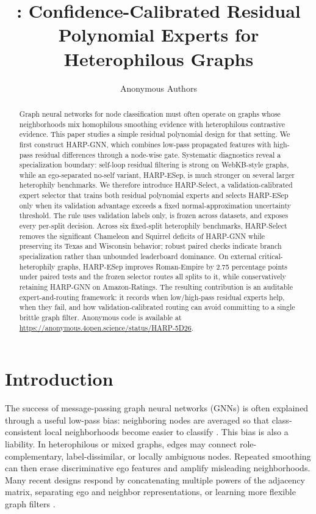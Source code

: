 \documentclass[letterpaper]{article} %
\title{\method: Confidence-Calibrated Residual Polynomial Experts for Heterophilous Graphs}
\author{
    Anonymous Authors
}
\newcommand{\base}{HARP-GNN}
\newcommand{\esep}{HARP-ESep}
\newcommand{\method}{HARP-Select}
\begin{document}
\maketitle

\begin{abstract}
Graph neural networks for node classification must often operate on graphs whose neighborhoods mix homophilous smoothing evidence with heterophilous contrastive evidence.
This paper studies a simple residual polynomial design for that setting.
We first construct \base, which combines low-pass propagated features with high-pass residual differences through a node-wise gate.
Systematic diagnostics reveal a specialization boundary: self-loop residual filtering is strong on WebKB-style graphs, while an ego-separated no-self variant, \esep, is much stronger on several larger heterophily benchmarks.
We therefore introduce \method, a validation-calibrated expert selector that trains both residual polynomial experts and selects \esep{} only when its validation advantage exceeds a fixed normal-approximation uncertainty threshold.
The rule uses validation labels only, is frozen across datasets, and exposes every per-split decision.
Across six fixed-split heterophily benchmarks, \method{} removes the significant Chameleon and Squirrel deficits of \base{} while preserving its Texas and Wisconsin behavior; robust paired checks indicate branch specialization rather than unbounded leaderboard dominance.
On external critical-heterophily graphs, \esep{} improves Roman-Empire by 2.75 percentage points under paired tests and the frozen selector routes all splits to it, while conservatively retaining \base{} on Amazon-Ratings.
The resulting contribution is an auditable expert-and-routing framework: it records when low/high-pass residual experts help, when they fail, and how validation-calibrated routing can avoid committing to a single brittle graph filter.
Anonymous code is available at \url{https://anonymous.4open.science/status/HARP-5D26}.
\end{abstract}

\section{Introduction}

The success of message-passing graph neural networks (GNNs) is often explained through a useful low-pass bias: neighboring nodes are averaged so that class-consistent local neighborhoods become easier to classify \cite{kipf2017semi,klicpera2019predict,wu2019simplifying}.
This bias is also a liability.
In heterophilous or mixed graphs, edges may connect role-complementary, label-dissimilar, or locally ambiguous nodes.
Repeated smoothing can then erase discriminative ego features and amplify misleading neighborhoods.
Many recent designs respond by concatenating multiple powers of the adjacency matrix, separating ego and neighbor representations, or learning more flexible graph filters \cite{abu2019mixhop,zhu2020beyond,chien2021gprgnn,bo2021beyond,he2021bernnet,lim2021large}.
\end{document}
